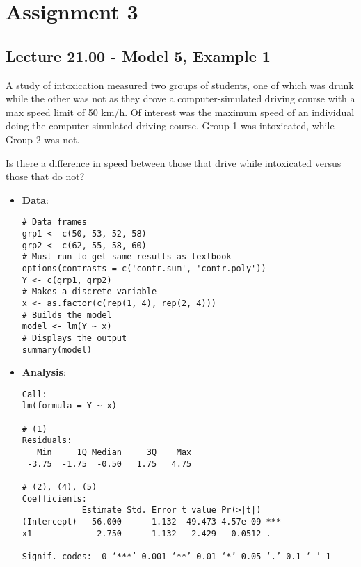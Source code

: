 \chapter{Assignment 3}
\section{Lecture 21.00 - Model 5, Example 1}
\begin{Example}{}{}
    A study of intoxication measured two groups of students,
    one of which was drunk while the other was not as
    they drove a computer-simulated driving course with a max speed limit of 50 km/h.
    Of interest was the maximum speed of an individual doing the computer-simulated driving
    course. Group 1 was intoxicated, while Group 2 was not.

    Is there a difference in speed between those that drive while
    intoxicated versus those that do not?

    \begin{itemize}
        \item \textbf{Data}:
              \begin{verbatim}
# Data frames
grp1 <- c(50, 53, 52, 58)
grp2 <- c(62, 55, 58, 60)
# Must run to get same results as textbook
options(contrasts = c('contr.sum', 'contr.poly'))
Y <- c(grp1, grp2)
# Makes a discrete variable
x <- as.factor(c(rep(1, 4), rep(2, 4)))
# Builds the model
model <- lm(Y ~ x)
# Displays the output
summary(model)
        \end{verbatim}
        \item \textbf{Analysis}:
              \begin{verbatim}
Call:
lm(formula = Y ~ x)

# (1)
Residuals:
   Min     1Q Median     3Q    Max 
 -3.75  -1.75  -0.50   1.75   4.75 

# (2), (4), (5)
Coefficients:
            Estimate Std. Error t value Pr(>|t|)    
(Intercept)   56.000      1.132  49.473 4.57e-09 ***
x1            -2.750      1.132  -2.429   0.0512 .  
---
Signif. codes:  0 ‘***’ 0.001 ‘**’ 0.01 ‘*’ 0.05 ‘.’ 0.1 ‘ ’ 1


\end{verbatim}
\end{itemize}
\end{Example}
